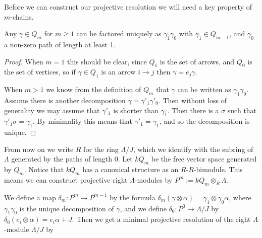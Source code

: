 Before we can construct our projective resolution we will need a key property of $m$-chains. 

\begin{lemma}\label{lem:unique_factorization_of_chains}
	Any $\gamma\in Q_m$ for $m \geq 1$ can be factored uniquely as $\gamma_1\gamma_0$ with $\gamma_1 \in Q_{m-1}$, and $\gamma_0$ a non-zero path of length at least 1.
	\begin{proof}
		When $m=1$ this should be clear, since $Q_1$ is the set of arrows, and $Q_0$ is the set of vertices, so if $\gamma \in Q_1$ is an arrow $i\to j$ then $\gamma = e_j\gamma$.
		
		When $m > 1$ we know from the definition of $Q_m$ that $\gamma$ can be written as $\gamma_1\gamma_0$. Assume there is another decomposition $\gamma = \gamma'_1\gamma'_0$. Then without loss of generality we may assume that $\gamma'_1$ is shorter than $\gamma_1$. Then there is a $\sigma$ such that $\gamma'_1\sigma = \gamma_1$. By minimality this means that $\gamma'_1=\gamma_1$, and so the decomposition is unique.
	\end{proof} 
\end{lemma} 

From now on we write $R$ for the ring $\Lambda/J$, which we identify with the subring of $\Lambda$ generated by the paths of length 0. Let $kQ_m$ be the free vector space generated by $Q_m$. Notice that $kQ_m$ has a canonical structure as an $R$-$R$-bimodule. This means we can construct projective right $\Lambda$-modules by $P^m := kQ_m\otimes_R\Lambda$.

\begin{prop}\label{prop:projective_res_of_top_monomial_alg}
We define a map $\delta_m \colon P^m \to P^{m-1}$ by the formula $\delta_m(\gamma \otimes \alpha) = \gamma_1 \otimes \gamma_0\alpha$, where $\gamma_1\gamma_0$ is the unique decomposition of $\gamma$, and we define $\delta_0 \colon P^0 \to \Lambda /J$ by $\delta_0(e_i\otimes \alpha) = e_i\alpha + J$. Then we get a minimal projective resolution of the right $\Lambda$-module $\Lambda/J$ by

\begin{center}
\end{center}
\end{prop}

